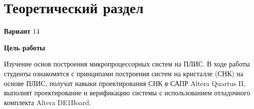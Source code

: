 \chapter{Теоретический раздел}
    
    \textbf{Вариант} 14

    \textbf{Цель работы}
    
    Изучение основ построения микропроцессорных систем на ПЛИС. В ходе работы студенты  ознакомятся с принципами построения систем на кристалле (СНК) на основе ПЛИС, получат навыки проектирования СНК в САПР Altera Quartus II, выполнят проектирование и  верификацию системы с использованием отладочного комплекта Altera DE1Board.

    